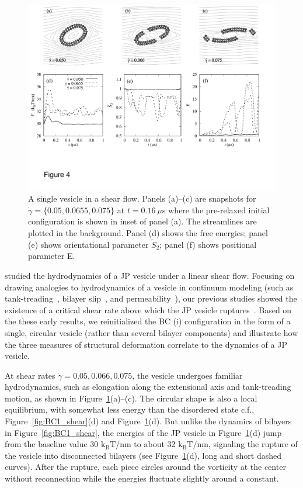 \documentclass[prb,preprint,showpacs,preprintnumbers,amsmath,amssymb,longbibliography]{revtex4-1}
\begin{document}
\begin{figure}
  \begin{center}
    \includegraphics[width=1.0\textwidth]{Figures/Figure4.pdf}
  \end{center}
  \caption{
    \label{fig:Ves_shear}
A single vesicle in a shear flow. Panels (a)--(c) are snapshots for
  $\dot \gamma = \{0.05, 0.0655, 0.075\}$ at $t=0.16\ \mu$s where the
  pre-relaxed initial configuration is shown in inset of panel (a). The
  streamlines are plotted in the background. Panel (d) shows the free
  energies; panel (e) shows orientational parameter $\tilde{S}_2$; panel
  (f) shows positional parameter E.}
\end{figure}
\citet{Fu2022_JFM} studied the hydrodynamics of a JP vesicle under a
linear shear flow. Focusing on drawing analogies to hydrodynamics of a
vesicle in continuum modeling (such as
tank-treading~\cite{keller_skalak_1982,Finken08,Shaqfeh11}, bilayer
slip~\cite{sch-vla-mik2010,denOtter2007,Zgorski2019}, and
permeability~\cite{chabanon2017, qua-gan-you2021}), our previous studies
showed the existence of a critical shear rate above which the JP vesicle
ruptures~\cite{grandmaison_brancherie_salsac_2021,D2SM00179A}. Based on
the these early results, we reinitialized the BC (i) configuration in
the form of a single, circular vesicle (rather than several bilayer
components) and illustrate how the three measures of structural
deformation correlate to the dynamics of a JP vesicle.

At shear rates $\dot\gamma=0.05, 0.066, 0.075$, the vesicle undergoes
familiar hydrodynamics, such as elongation along the extensional axis
and tank-treading motion, as shown in
Figure~\ref{fig:Ves_shear}(a)--(c).
%
The circular shape is also a local equilibrium, with somewhat less
energy than the disordered state c.f., Figure~\ref{fig:BC1_shear}(d) and
Figure~\ref{fig:Ves_shear}(d). But unlike the dynamics of bilayers in
Figure~\ref{fig:BC1_shear}, the energies of the JP vesicle in
Figure~\ref{fig:Ves_shear}(d) jump from the baseline value 30
$\mathrm{k_BT}$/nm to about 32 $\mathrm{k_BT}$/nm, signaling the rupture
of the vesicle into disconnected bilayers (see
Figure~\ref{fig:Ves_shear}(d), long and short dashed curves).  After the
rupture, each piece circles around the vorticity at the center without
reconnection while the energies fluctuate slightly around a constant.
\end{document}
